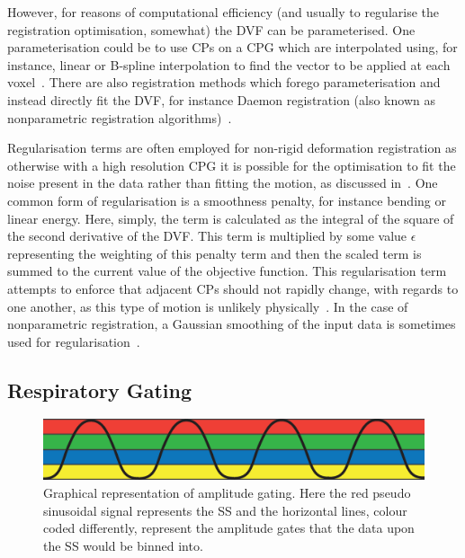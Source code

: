                 However, for reasons of computational efficiency (and usually to regularise the registration optimisation, somewhat) the \gls{DVF} can be parameterised. One parameterisation could be to use \glspl{CP} on a \gls{CPG} which are interpolated using, for instance, linear or B-spline interpolation to find the vector to be applied at each voxel~\parencite{Bardinet1996, Rueckertetal.1999, Mattes2003, JacobsonFesslerMotionCorrectionBib}. There are also registration methods which forego parameterisation and instead directly fit the \gls{DVF}, for instance Daemon registration (also known as nonparametric registration algorithms)~\parencite{Vercauteren2009DiffeomorphicRegistration.}.
                
                Regularisation terms are often employed for non-rigid deformation registration as otherwise with a high resolution \gls{CPG} it is possible for the optimisation to fit the noise present in the data rather than fitting the motion, as discussed in~. One common form of regularisation is a smoothness penalty, for instance bending or linear energy. Here, simply, the term is calculated as the integral of the square of the second derivative of the \gls{DVF}. This term is multiplied by some value $\epsilon$ representing the weighting of this penalty term and then the scaled term is summed to the current value of the objective function. This regularisation term attempts to enforce that adjacent \glspl{CP} should not rapidly change, with regards to one another, as this type of motion is unlikely physically~\parencite{Duchon1977SplinesSpaces}. In the case of nonparametric registration, a Gaussian smoothing of the input data is sometimes used for regularisation~\parencite{Vercauteren2009DiffeomorphicRegistration.}.
        
        \subsection{Respiratory Gating} \label{sec:respiratory_gating}
            
            \begin{figure}
                \centering
                    
                \includegraphics[width=1.0\linewidth]{figures/background_amplitude_gating.png}
                    
                \captionsetup{singlelinecheck=false, justification=raggedright}
                \caption{Graphical representation of amplitude gating. Here the red pseudo sinusoidal signal represents the \gls{SS} and the horizontal lines, colour coded differently, represent the amplitude gates that the data upon the \gls{SS} would be binned into.} \label{fig:respiratory_gating_ampliude_gating}
            \end{figure}
            
